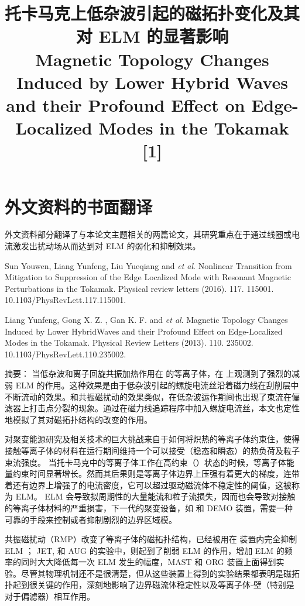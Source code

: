
\chapter{外文资料的书面翻译}

外文资料部分翻译了与本论文主题相关的两篇论文，其研究重点在于通过线圈或电流激发出扰动场从而达到对 ELM 的弱化和抑制效果。


\begin{translationbib}
  \item Sun Youwen, Liang Yunfeng, Liu Yueqiang and \textit{et al}. Nonlinear Transition from Mitigation to Suppression of the Edge Localized Mode with Resonant Magnetic Perturbations in the \east Tokamak. Physical review letters (2016). 117. 115001. 10.1103/PhysRevLett.117.115001. 
  \item Liang Yunfeng, Gong X. Z. , Gan K. F. and \textit{et al}. Magnetic Topology Changes Induced by Lower HybridWaves and their Profound Effect on Edge-Localized Modes in the \east Tokamak. Physical Review Letters (2013). 110. 235002. 10.1103/PhysRevLett.110.235002. 
\end{translationbib}


\title{\textbf{ \east  托卡马克上低杂波引起的磁拓扑变化及其对 ELM 的显著影响\\Magnetic Topology Changes Induced by Lower Hybrid Waves and their Profound Effect on Edge-Localized Modes in the \east Tokamak} [1]}

{\heiti 摘要：} {\kaishu 当低杂波和离子回旋共振加热作用在 \Hmode 的等离子体，在  \east  上观测到了强烈的减弱 ELM 的作用。这种效果是由于低杂波引起的螺旋电流丝沿着磁力线在刮削层中不断流动的效果。和共振磁扰动的效果类似，在低杂波运作期间也出现了束流在偏滤器上打击点分裂的现象。通过在磁力线追踪程序中加入螺旋电流丝，本文也定性地模拟了其对磁拓扑结构的改变的作用。}



对聚变能源研究及相关技术的巨大挑战来自于如何将炽热的等离子体约束住，使得接触等离子体的材料在运行期间维持一个可以接受（稳态和瞬态）的热负荷及粒子束流强度。
当托卡马克中的等离子体工作在高约束（\Hmode）状态的时候，等离子体能量约束时间显著增长。然而其后果则是等离子体边界上压强有着更大的梯度，连带着还有边界上增强了的电流密度，它可以超过驱动磁流体不稳定性的阈值，这被称为 ELM。 ELM 会导致拟周期性的大量能流和粒子流损失，因而也会导致对接触的等离子体材料的严重损害，下一代的聚变设备，如 \iter 和 DEMO 装置，需要一种可靠的手段来控制或者抑制剧烈的边界区域模。

共振磁扰动（RMP）改变了等离子体的磁拓扑结构，已经被用在 \ddd 装置内完全抑制 ELM ； JET, \mast 和 AUG 的实验中，则起到了削弱 ELM 的作用，增加 ELM 的频率的同时大大降低每一次 ELM 发生的幅度，MAST 和 ORG 装置上面得到实验。尽管其物理机制还不是很清楚，但从这些装置上得到的实验结果都表明是磁拓扑起到很关键的作用，深刻地影响了边界磁流体稳定性以及等离子体-壁（特别是对于偏滤器）相互作用。


